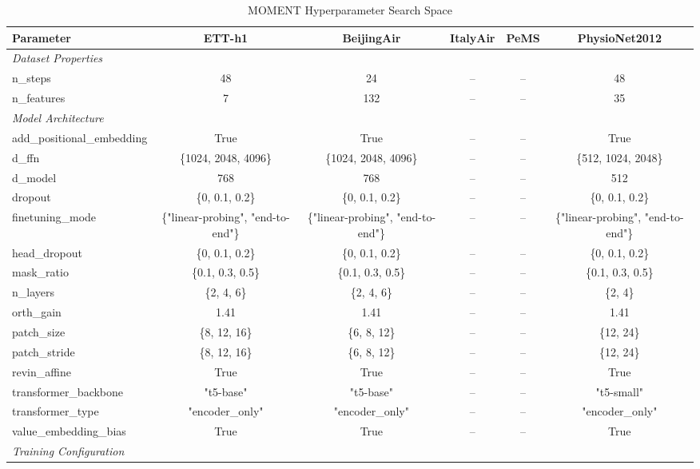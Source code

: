 \begin{table}[H]
\centering
\caption{MOMENT Hyperparameter Search Space}
\label{tab:hyperparam_moment}
\begin{adjustbox}{max width=\textwidth}
\begin{small}
\begin{tabular}{l|ccccc}
\toprule
\textbf{Parameter} & \textbf{ETT-h1} & \textbf{BeijingAir} & \textbf{ItalyAir} & \textbf{PeMS} & \textbf{PhysioNet2012} \\
\midrule
\multicolumn{6}{l}{\textit{Dataset Properties}} \\
n\_steps & 48 & 24 & -- & -- & 48 \\
n\_features & 7 & 132 & -- & -- & 35 \\
\midrule
\multicolumn{6}{l}{\textit{Model Architecture}} \\
add\_positional\_embedding & True & True & -- & -- & True \\
d\_ffn & \{1024, 2048, 4096\} & \{1024, 2048, 4096\} & -- & -- & \{512, 1024, 2048\} \\
d\_model & 768 & 768 & -- & -- & 512 \\
dropout & \{0, 0.1, 0.2\} & \{0, 0.1, 0.2\} & -- & -- & \{0, 0.1, 0.2\} \\
finetuning\_mode & \{"linear-probing", "end-to-end"\} & \{"linear-probing", "end-to-end"\} & -- & -- & \{"linear-probing", "end-to-end"\} \\
head\_dropout & \{0, 0.1, 0.2\} & \{0, 0.1, 0.2\} & -- & -- & \{0, 0.1, 0.2\} \\
mask\_ratio & \{0.1, 0.3, 0.5\} & \{0.1, 0.3, 0.5\} & -- & -- & \{0.1, 0.3, 0.5\} \\
n\_layers & \{2, 4, 6\} & \{2, 4, 6\} & -- & -- & \{2, 4\} \\
orth\_gain & 1.41 & 1.41 & -- & -- & 1.41 \\
patch\_size & \{8, 12, 16\} & \{6, 8, 12\} & -- & -- & \{12, 24\} \\
patch\_stride & \{8, 12, 16\} & \{6, 8, 12\} & -- & -- & \{12, 24\} \\
revin\_affine & True & True & -- & -- & True \\
transformer\_backbone & "t5-base" & "t5-base" & -- & -- & "t5-small" \\
transformer\_type & "encoder\_only" & "encoder\_only" & -- & -- & "encoder\_only" \\
value\_embedding\_bias & True & True & -- & -- & True \\
\midrule
\multicolumn{6}{l}{\textit{Training Configuration}} \\

\end{tabular}
\end{small}
\end{adjustbox}
\end{table}
